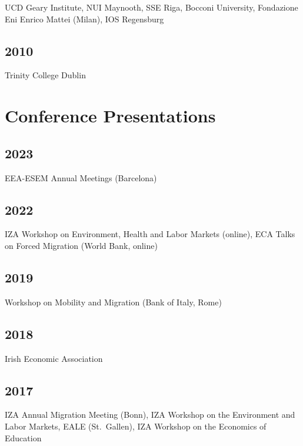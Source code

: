 \documentclass[10pt,a4paper,]{article}
\begin{document}
UCD Geary Institute, NUI Maynooth, SSE Riga, Bocconi University,
Fondazione Eni Enrico Mattei (Milan), IOS Regensburg

\hypertarget{section-13}{%
\subsection{2010}\label{section-13}}

Trinity College Dublin

\hypertarget{conference-presentations}{%
\section{Conference Presentations}\label{conference-presentations}}

\hypertarget{section-14}{%
\subsection{2023}\label{section-14}}

EEA-ESEM Annual Meetings (Barcelona)

\hypertarget{section-15}{%
\subsection{2022}\label{section-15}}

IZA Workshop on Environment, Health and Labor Markets (online), ECA
Talks on Forced Migration (World Bank, online)

\hypertarget{section-16}{%
\subsection{2019}\label{section-16}}

Workshop on Mobility and Migration (Bank of Italy, Rome)

\hypertarget{section-17}{%
\subsection{2018}\label{section-17}}

Irish Economic Association

\hypertarget{section-18}{%
\subsection{2017}\label{section-18}}

IZA Annual Migration Meeting (Bonn), IZA Workshop on the Environment and
Labor Markets, EALE (St.~Gallen), IZA Workshop on the Economics of
Education
\end{document}
